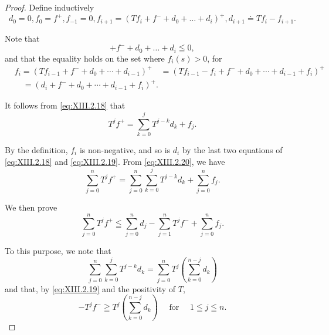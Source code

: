 \begin{proof}
 Define inductively 
\begin{equation}d _{0} = 0, f _{0} = f ^{+}, f _{-1} = 0, f _{i+1} = \left(T f _{i} + f ^{-} + d _{0} + \dots + d _{i}\right) ^{+}, d _{i+1} \doteq T f _{i} - f _{i+1}.  \label{eq:XIII.2.18}\end{equation}

Note that 
\begin{equation}\label{eq:XIII.2.19}
+ f ^{-} + d _{0} + \dots + d _{i} \leqq 0,
\end{equation}
and that the equality holds on the set where $f_{i}(s) > 0$, for 
\[
\begin{aligned}
&{f _{i} = (T f _{i-1} + f ^{-} + d _{0} + \cdots + d _{i-1}) ^{+}} {\quad = (T f _{i-1} - f _{i} + f ^{-} + d _{0} + \cdots + d _{i-1} + f _{i}) ^{+}} \\
&{\quad = (d _{i} + f ^{-} + d _{0} + \cdots + d _{i-1} + f _{i}) ^{+}.}
\end{aligned}
\]

It follows from \eqref{eq:XIII.2.18} that 
\begin{equation}\label{eq:XIII.2.20}
T ^{j} f ^{+} = \sum\limits_{k=0} ^{j} T ^{j-k} d _{k} + f _{j}.
\end{equation}

By the definition, $f_{i}$ is non-negative, and so is $d_{i}$ by the last two equations of \eqref{eq:XIII.2.18} and \eqref{eq:XIII.2.19}. From \eqref{eq:XIII.2.20}, we have 
\begin{equation}\label{eq:XIII.2.21}
\sum\limits_{j=0} ^{n} T ^{j} f ^{+} = \sum\limits_{j=0} ^{n} \sum\limits_{k=0} ^{j} T ^{j-k} d _{k} + \sum\limits_{j=0} ^{n} f _{j}.
\end{equation}

We then prove 
\begin{equation}\label{eq:XIII.2.22}
\sum\limits_{j=0} ^{n} T ^{j} f ^{+} \leqq \sum\limits_{j=0} ^{n} d _{j} - \sum\limits_{j=1} ^{n} T ^{j} f ^{-} + \sum\limits_{j=0} ^{n} f _{j}.
\end{equation}

To this purpose, we note that 
\[
\sum\limits_{j=0} ^{n} \sum\limits_{k=0} ^{j} T ^{j-k} d _{k} = \sum\limits_{j=0} ^{n} T ^{j} \left(\sum\limits_{k=0} ^{n-j} d _{k}\right)
\]
and that, by \eqref{eq:XIII.2.19} and the positivity of $T$, 
\begin{equation}\label{eq:XIII.2.23}
- T ^{j} f ^{-} \geqq T ^{j} \left(\sum\limits_{k=0} ^{n-j} d _{k}\right) \quad \text{ for } \quad 1 \leqq j \leqq n.
\end{equation}


\end{proof}
